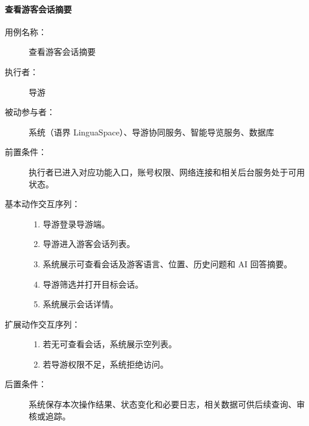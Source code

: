 \paragraph{查看游客会话摘要}
\begin{description}
  \item[用例名称：] 查看游客会话摘要
  \item[执行者：] 导游
  \item[被动参与者：] 系统（语界 LinguaSpace）、导游协同服务、智能导览服务、数据库
  \item[前置条件：] 执行者已进入对应功能入口，账号权限、网络连接和相关后台服务处于可用状态。
  \item[基本动作交互序列：]
  \begin{enumerate}
    \item 导游登录导游端。
    \item 导游进入游客会话列表。
    \item 系统展示可查看会话及游客语言、位置、历史问题和 AI 回答摘要。
    \item 导游筛选并打开目标会话。
    \item 系统展示会话详情。
  \end{enumerate}
  \item[扩展动作交互序列：]
  \begin{enumerate}
    \item[3a.] 若无可查看会话，系统展示空列表。
    \item[4a.] 若导游权限不足，系统拒绝访问。
  \end{enumerate}
  \item[后置条件：] 系统保存本次操作结果、状态变化和必要日志，相关数据可供后续查询、审核或追踪。
\end{description}

